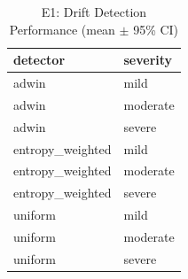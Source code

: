 \begin{table}
\caption{E1: Drift Detection Performance (mean $\pm$ 95\% CI)}
\label{tab:e1_stats}
\begin{tabular}{ll}
\toprule
detector & severity \\
\midrule
adwin & mild \\
adwin & moderate \\
adwin & severe \\
entropy_weighted & mild \\
entropy_weighted & moderate \\
entropy_weighted & severe \\
uniform & mild \\
uniform & moderate \\
uniform & severe \\
\bottomrule
\end{tabular}
\end{table}
